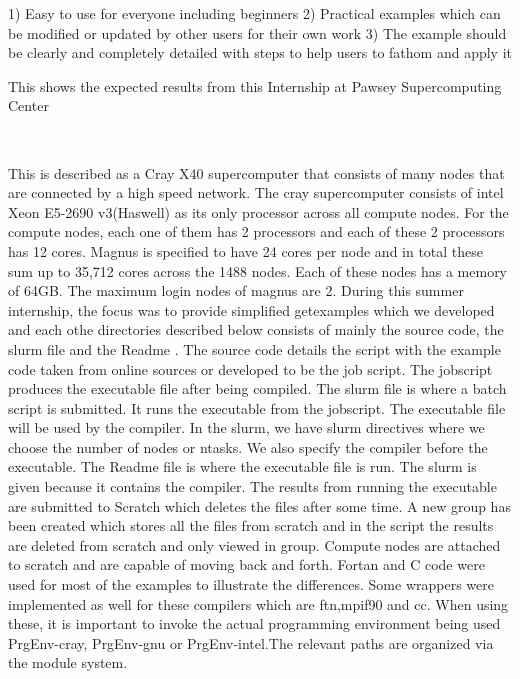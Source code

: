 \begin{Document}
{1) Easy to use for everyone including beginners
2) Practical examples which can be modified or updated by other users for their own work
3) The example should be clearly and completely detailed with steps to help users to fathom and apply it

\begin{scope}

This shows the expected results from this Internship at Pawsey Supercomputing Center
\
\



\end{scope}
\


This is described as a Cray X40 supercomputer that consists of many nodes that are connected by a high speed network. The cray supercomputer consists of intel Xeon E5-2690 v3(Haswell) as its only processor across all compute nodes. For the compute nodes, each one of them has 2 processors and each of these 2 processors has 12 cores.
Magnus is specified to have 24 cores per node and in total these sum up to 35,712 cores across the 1488 nodes. Each of these nodes has a memory of 64GB. The maximum login nodes of magnus are 2.
During this summer internship, the focus was to provide simplified getexamples which we developed and each othe directories described below consists of mainly the source code, the slurm file and the Readme . The source code details the script with the example code taken from online sources or developed to be the job script. The jobscript produces the executable file after being compiled. The slurm file is where a batch script is submitted. It runs the executable from the jobscript. The executable file will be used by the compiler. In the slurm, we have slurm directives where we choose the number of nodes or ntasks. We also specify the compiler before the executable. The Readme file is where the executable file is run. The slurm is given because it contains the compiler. The results from running the executable are submitted to Scratch which deletes the files after some time. A new group has been created which stores all the files from scratch and in the script the results are deleted from scratch and only viewed in group. Compute nodes are attached to scratch and are capable of moving back and forth.
Fortan and C code were used for most of the examples to illustrate the differences. Some wrappers were implemented as well for these compilers which are ftn,mpif90 and cc. When using these, it is important to invoke the actual programming environment being used PrgEnv-cray, PrgEnv-gnu or PrgEnv-intel.The relevant paths are organized via the module system.



}
\end{Document}
